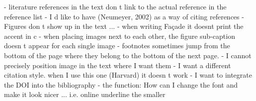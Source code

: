 - literature references in the text don t link to the actual reference in the reference list
- I d like to have (Neumeyer, 2002) as a way of citing references
- Figures don t show up in the text ...
- when writing Façade it doesnt print the accent in c
- when placing images next to each other, the figure sub-caption doesn t appear for each single image
- footnotes sometimes jump from the bottom of the page where they belong to the bottom of the next page.
- I cannot precisely position image in the text where I want them
- I want a different citation style. %
when I use this one (Harvard) it doesn t work  
- I want to integrate the DOI into the bibliography
- the \url{} function: How can I change the font and make it look nicer ... i.e. online underline the smaller 